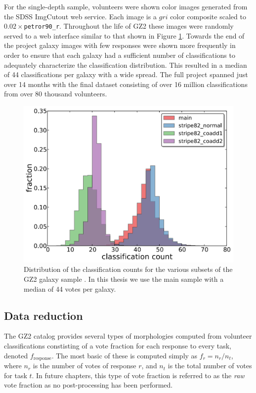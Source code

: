 For the single-depth sample, volunteers were shown color images generated from the SDSS ImgCutout web service. Each image is a $gri$ color composite scaled to $0.02\times$\texttt{petror90\_r}. Throughout the life of GZ2 these images were randomly served to a web interface similar to that shown in Figure \ref{fig: gz2 interface}. Towards the end of the project galaxy images with few responses were shown more frequently in order to ensure that each galaxy had a sufficient number of classifications to adequately characterize the classification distribution. This resulted in a median of 44 classifications per galaxy with a wide spread. The full project spanned just over 14 months with the final dataset consisting of over 16 million classifications from over 80 thousand volunteers. 
 
\begin{figure}[h!]
\centering
\includegraphics[width=5in]{Figures/GZ2_classification_count.png}
\caption[Galaxy Zoo 2 classification count distributions]{Distribution of the classification counts for the various subsets of the GZ2 galaxy sample \citep[credit:][]{Willett2013}. In this thesis we use the main sample with a median of 44 votes per galaxy.}
\label{fig: gz2 interface}
\end{figure}

\subsection{Data reduction}
The GZ2 catalog provides several types of morphologies computed from volunteer classifications constisting of a vote fraction for each response to every task, denoted $f_{\mathrm{response}}$. The most basic of these is computed simply as $f_r = n_r/n_t$, where $n_r$ is the number of votes of response $r$, and $n_t$ is the total number of votes for task $t$. In future chapters, this type of vote fraction is referred to as the \textit{raw} vote fraction as no post-processing has been performed. 

